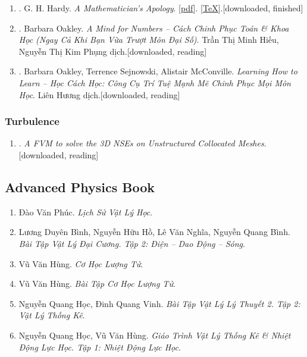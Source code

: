 \documentclass{article}
\begin{document}
\begin{enumerate}
	\item \cite{Hardy1940, Hardy1992, Hardy2022}. G. H. Hardy. \textit{A Mathematician's Apology}. [\href{https://github.com/NQBH/hobby/blob/master/advanced_mathematics/Hardy2017/NQBH_Hardy2017.pdf}{pdf}]. [\href{https://github.com/NQBH/hobby/blob/master/advanced_mathematics/Hardy2017/NQBH_Hardy2017.tex}{\TeX}].\hfill\textsf{[downloaded, finished]}
	\item \cite{Oakley2022}. Barbara Oakley. \textit{A Mind for Numbers -- Cách Chinh Phục Toán \& Khoa Học (Ngay Cả Khi Bạn Vừa Trượt Môn Đại Số)}. Trần Thị Minh Hiếu, Nguyễn Thị Kim Phụng dịch.\hfill\textsf{[downloaded, reading]}
	\item \cite{Oakley_Sejnowski_McConville2022}. Barbara Oakley, Terrence Sejnowski, Alistair McConville. \textit{Learning How to Learn -- Học Cách Học: Công Cụ Trí Tuệ Mạnh Mẽ Chinh Phục Mọi Môn Học}. Liên Hương dịch.\hfill\textsf{[downloaded, reading]}
\end{enumerate}

\subsubsection{Turbulence}

\begin{enumerate}
	\item \cite{Perron_Boivin_Herard2004}. \textit{A FVM to solve the 3{D} NSEs on Unstructured Collocated Meshes}.\hfill\textsf{[downloaded, reading]}
\end{enumerate}


\subsection{Advanced Physics Book}

\begin{enumerate}
	\item Đào Văn Phúc. \textit{Lịch Sử Vật Lý Học}.
	\item Lương Duyên Bình, Nguyễn Hữu Hồ, Lê Văn Nghĩa, Nguyễn Quang Bình. \textit{Bài Tập Vật Lý Đại Cương. Tập 2: Điện -- Dao Động -- Sóng}.
	\item Vũ Văn Hùng. \textit{Cơ Học Lượng Tử}.
	\item Vũ Văn Hùng. \textit{Bài Tập Cơ Học Lượng Tử}.
	\item Nguyễn Quang Học, Đinh Quang Vinh. \textit{Bài Tập Vật Lý Lý Thuyết 2. Tập 2: Vật Lý Thống Kê}.
	\item Nguyễn Quang Học, Vũ Văn Hùng. \textit{Giáo Trình Vật Lý Thống Kê \& Nhiệt Động Lực Học. Tập 1: Nhiệt Động Lực Học}.
\end{enumerate}
\end{document}
